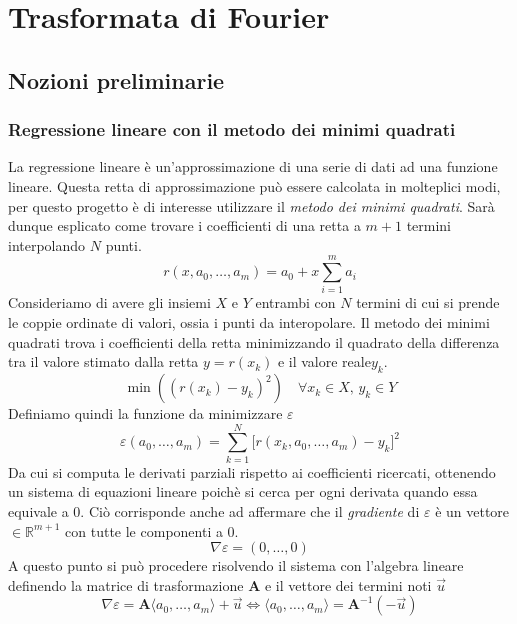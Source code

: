 \chapter{Trasformata di Fourier}

\section{Nozioni preliminarie}

\subsection{Regressione lineare con il metodo dei minimi quadrati}
La regressione lineare \`e un'approssimazione di una serie di dati ad una
funzione lineare. Questa retta di approssimazione pu\`o essere calcolata in
molteplici modi, per questo progetto \`e di interesse utilizzare il
\emph{metodo dei minimi quadrati}.  Sar\`a dunque esplicato come trovare i
coefficienti di una retta a \(m+1\) termini interpolando \(N\) punti.
\begin{equation}
    r(x, a_0, \dots, a_m) = a_0 + x\sum_{i=1}^{m}a_i
\end{equation}
Consideriamo di avere gli insiemi \(X\) e \(Y\) entrambi con \(N\) termini di
cui si prende le coppie ordinate di valori, ossia i punti da interopolare.  Il
metodo dei minimi quadrati trova i coefficienti della retta minimizzando il
quadrato della differenza tra il valore stimato dalla retta \(y = r(x_k)\) e il
valore reale\(y_k\).
\begin{equation*}
    \min((r(x_k) - y_k)^2)\quad \forall x_k\in X,\, y_k\in Y
\end{equation*}
Definiamo quindi la funzione da minimizzare \(\varepsilon\)
\begin{equation}
    \varepsilon(a_0, \dots, a_m) = \sum_{k=1}^{N}\Big[r(x_k, a_0, \dots, a_m)  - y_k\Big]^2
\end{equation}
Da cui si computa le derivati parziali rispetto ai coefficienti ricercati,
ottenendo un sistema di equazioni lineare poich\`e si cerca per ogni derivata
quando essa equivale a 0. Ci\`o corrisponde anche ad affermare che il
\emph{gradiente} di \(\varepsilon\) \`e un vettore
\(\in\mathbb{R}^{m+1}\) con tutte le componenti a 0.
\begin{equation*}
    \nabla\varepsilon = (0, \dots, 0 )
\end{equation*}
A questo punto si pu\`o procedere risolvendo il sistema con l'algebra lineare
definendo la matrice di trasformazione \(\mathbf{A}\) e il vettore dei termini
noti \(\vec{u}\)
\begin{equation*}
    \nabla \varepsilon = \mathbf{A}
        \langle a_0, \dots,  a_m \rangle + \vec{u} \iff
    \langle a_0, \dots, a_m \rangle =
        \mathbf{A}^{-1}(-\vec{u})
\end{equation*}


